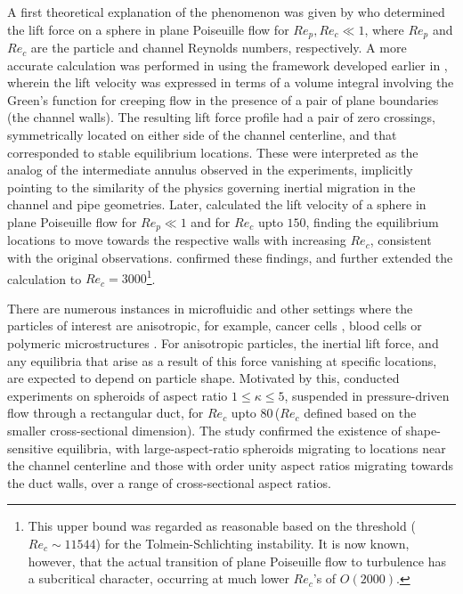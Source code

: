 \documentclass{jfm}
\begin{document}
A first theoretical explanation of the phenomenon was given by \cite{holeal1974} who determined the lift force on a sphere in plane Poiseuille flow for $Re_p, Re_c\ll1$, where $Re_p$ and $Re_c$ are the particle and channel Reynolds numbers, respectively. A more accurate calculation was performed in \cite{vasseur1976} using the framework developed earlier in \cite{coxbrenner1968}, wherein the lift velocity was expressed in terms of a volume integral involving the Green's function for creeping flow in the presence of a pair of plane boundaries\,(the channel walls). The resulting lift force profile had a pair of zero crossings, symmetrically located on either side of the channel centerline, and that corresponded to stable equilibrium locations. These were interpreted as the analog of the intermediate annulus observed in the experiments, implicitly pointing to the similarity of the physics governing inertial migration in the channel and pipe geometries. Later, \cite{schonberghinch1989} calculated the lift velocity of a sphere in plane Poiseuille flow for $Re_p\ll1$ and for $Re_c$ upto $150$, finding the equilibrium locations to move towards the respective walls with increasing $Re_c$, consistent with the original observations. \cite{asmolov1999} confirmed these  findings, and further extended the calculation to $Re_c=3000$\footnote{This upper bound was regarded as reasonable based on the threshold ($Re_c\sim11544$) for the Tolmein-Schlichting instability. It is now known, however, that the actual transition of plane Poiseuille flow to turbulence has a subcritical character, occurring at much lower $Re_c$'s of $O(2000)$.}.

There are numerous instances in microfluidic and other settings where the particles of interest are anisotropic, for example, cancer cells \citep{suresh2007}, blood cells \citep{irimia2005} or polymeric microstructures \citep{chung2008}. For anisotropic particles, the inertial lift force, and any equilibria that arise as a result of this force vanishing at specific locations, are expected to depend on particle shape. Motivated by this, \cite{masaeli2012} conducted experiments on spheroids of aspect ratio $1\leq\kappa\leq5$, suspended in pressure-driven flow through a rectangular duct, for $Re_c$ upto $80$\,($Re_c$ defined based on the smaller cross-sectional dimension). The study confirmed the existence of shape-sensitive equilibria, with large-aspect-ratio spheroids migrating to locations near the channel centerline and those with order unity aspect ratios migrating towards the duct walls, over a range of cross-sectional aspect ratios. 
\end{document}
